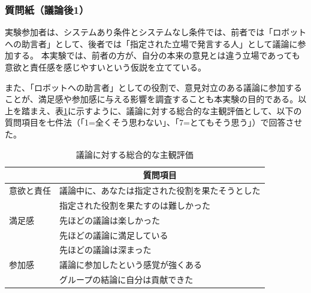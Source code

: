 \documentclass[11pt, a4paper]{jreport} %
\begin{document}




\subsubsection*{質問紙（議論後1）}
実験参加者は、システムあり条件とシステムなし条件では、前者では「ロボットへの助言者」として、後者では「指定された立場で発言する人」として議論に参加する。
本実験では、前者の方が、自分の本来の意見とは違う立場であっても意欲と責任感を感じやすいという仮説を立てている。

また、「ロボットへの助言者」としての役割で、意見対立のある議論に参加することが、満足感や参加感に与える影響を調査することも本実験の目的である。以上を踏まえ、表\ref{tab:indev}に示すように、議論に対する総合的な主観評価として、以下の質問項目を七件法（「1=全くそう思わない」、「7=とてもそう思う」）で回答させた。


\begin{table}[H]
\caption{議論に対する総合的な主観評価}
\centering
\label{tab:indev}
\begin{tabular}{@{}ll@{}}
\toprule
\multicolumn{1}{c}{} & \multicolumn{1}{c}{質問項目} \\ \midrule
意欲と責任                & 議論中に、あなたは指定された役割を果たそうとした \\
                     & 指定された役割を果たすのは難しかった       \\
満足感                  & 先ほどの議論は楽しかった             \\
                     & 先ほどの議論に満足している            \\
                     & 先ほどの議論は深まった              \\
参加感                  & 議論に参加したという感覚が強くある        \\
                     & グループの結論に自分は貢献できた         \\ \bottomrule
\end{tabular}
\end{table}
\end{document}
